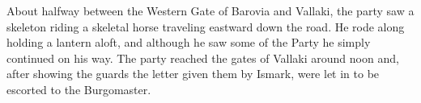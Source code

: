 \documentclass[a4paper,11pt]{article}
\begin{document}
About halfway between the Western Gate of Barovia and Vallaki, the party saw a skeleton riding a skeletal horse
traveling eastward down the road. He rode along holding a lantern aloft, and although he saw some of the Party he 
simply continued on his way. The party reached the gates of Vallaki around noon and, after showing the guards the 
letter given them by Ismark, were let in to be escorted to the Burgomaster.

\end{document}
